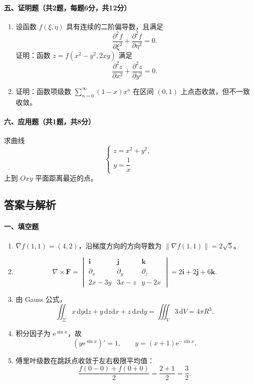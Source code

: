 \paragraph*{五、证明题（共2题，每题6分，共12分）}
\begin{enumerate}
  \item 设函数 \(f(\xi,\eta)\) 具有连续的二阶偏导数，且满足
  \[
    \frac{\partial^2f}{\partial \xi^2}+\frac{\partial^2f}{\partial \eta^2}=0.
  \]
  证明：函数 \(z=f(x^2-y^2,2xy)\) 满足
  \[
    \frac{\partial^2z}{\partial x^2}+\frac{\partial^2z}{\partial y^2}=0.
  \]

  \item 证明：函数项级数 \(\displaystyle \sum_{n=0}^{\infty}(1-x)x^n\) 在区间 \((0,1)\) 上点态收敛，但不一致收敛。
\end{enumerate}

\paragraph*{六、应用题（共1题，共8分）}
求曲线
\[
  \begin{cases}
    z=x^2+y^2,\\
    y=\dfrac1x
  \end{cases}
\]
上到 \(Oxy\) 平面距离最近的点。

\subsection{答案与解析}
\paragraph*{一、填空题}
\begin{enumerate}
  \item \(\nabla f(1,1)=(4,2)\)，沿梯度方向的方向导数为 \(\|\nabla f(1,1)\|=2\sqrt5\)。
  \item
  \[
    \nabla\times\mathbf F=
    \begin{vmatrix}
      \mathbf i&\mathbf j&\mathbf k\\
      \partial_x&\partial_y&\partial_z\\
      2x-3y&3x-z&y-2x
    \end{vmatrix}
    =2\mathbf i+2\mathbf j+6\mathbf k.
  \]
  \item 由 Gauss 公式，
  \[
    \iint_\Sigma x\,\mathrm{d}y\mathrm{d}z+y\,\mathrm{d}z\mathrm{d}x+z\,\mathrm{d}x\mathrm{d}y
    =\iiint_V3\,\mathrm{d}V=4\pi R^3.
  \]
  \item 积分因子为 \(\mathrm{e}^{\sin x}\)，故
  \[
    (y\mathrm{e}^{\sin x})'=1,\qquad y=(x+1)\mathrm{e}^{-\sin x}.
  \]
  \item 傅里叶级数在跳跃点收敛于左右极限平均值：
  \[
    \frac{f(0-0)+f(0+0)}2=\frac{2+1}{2}=\frac32.
  \]
\end{enumerate}

